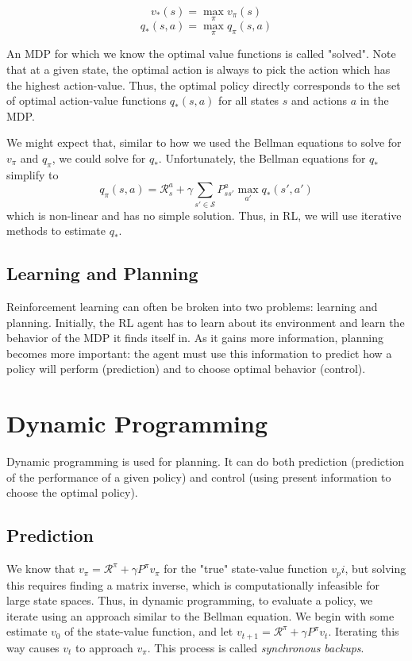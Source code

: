 \documentclass{article}
\newcommand{\ita}{\textit}
\begin{document}
$$v_*(s) = \max_\pi v_\pi(s)$$
$$q_*(s, a) = \max_\pi q_\pi(s, a)$$

An MDP for which we know the optimal value functions is called "solved". Note that at a given state, the optimal action is always to pick the action which has the highest action-value. Thus, the optimal policy directly corresponds to the set of optimal action-value functions $q_*(s, a)$ for all states $s$ and actions $a$ in the MDP.

We might expect that, similar to how we used the Bellman equations to solve for $v_\pi$ and $q_\pi$, we could solve for $q_*$. Unfortunately, the Bellman equations for $q_*$ simplify to
$$q_\pi(s, a) =  \mathcal{R}^a_s + \gamma\sum_{s'\in\mathcal{S}}P^a_{ss'}\max_{a'}q_*(s', a')$$
which is non-linear and has no simple solution. Thus, in RL, we will use iterative methods to estimate $q_*$.

\subsection{Learning and Planning}

Reinforcement learning can often be broken into two problems: learning and planning. Initially, the RL agent has to learn about its environment and learn the behavior of the MDP it finds itself in. As it gains more information, planning becomes more important: the agent must use this information to predict how a policy will perform (prediction) and to choose optimal behavior (control).

\section{Dynamic Programming}

Dynamic programming is used for planning. It can do both prediction (prediction of the performance of a given policy) and control (using present information to choose the optimal policy).

\subsection{Prediction}

We know that $v_\pi = \mathcal{R}^\pi + \gamma P^\pi v_\pi$ for the "true" state-value function $v_pi$, but solving this requires finding a matrix inverse, which is computationally infeasible for large state spaces. Thus, in dynamic programming, to evaluate a policy, we iterate using an approach similar to the Bellman equation. We begin with some estimate $v_0$ of the state-value function, and let $v_{t+1} =  \mathcal{R}^\pi + \gamma P^\pi v_t$. Iterating this way causes $v_t$ to approach $v_\pi$. This process is called \ita{synchronous backups}.
\end{document}

